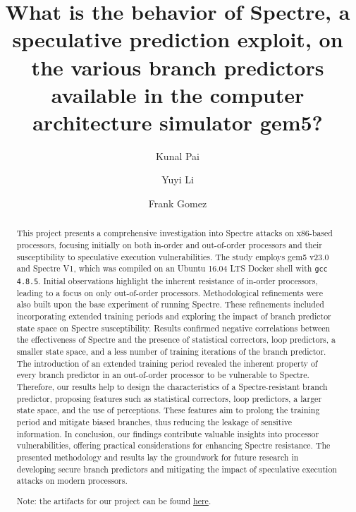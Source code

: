 \documentclass[twocolumn,showpacs,%
  nofootinbib,aps,superscriptaddress,%
  eqsecnum,prd,notitlepage,showkeys,10pt]{revtex4-1}
\begin{document}
\title{What is the behavior of Spectre, a speculative prediction exploit, on the various branch predictors available in the computer architecture simulator gem5?}
\author{Kunal Pai}
\author{Yuyi Li}
\author{Frank Gomez}

\begin{abstract}
This project presents a comprehensive investigation into Spectre attacks on x86-based processors, focusing initially on both in-order and out-of-order processors and their susceptibility to speculative execution vulnerabilities. The study employs gem5 v23.0 and Spectre V1, which was compiled on an Ubuntu 16.04 LTS Docker shell with \verb|gcc 4.8.5|. Initial observations highlight the inherent resistance of in-order processors, leading to a focus on only out-of-order processors. Methodological refinements were also built upon the base experiment of running Spectre. These refinements included incorporating extended training periods and exploring the impact of branch predictor state space on Spectre susceptibility. Results confirmed negative correlations between the effectiveness of Spectre and the presence of statistical correctors, loop predictors, a smaller state space, and a less number of training iterations of the branch predictor. The introduction of an extended training period revealed the inherent property of every branch predictor in an out-of-order processor to be vulnerable to Spectre. Therefore, our results help to design the characteristics of a Spectre-resistant branch predictor, proposing features such as statistical correctors, loop predictors, a larger state space, and the use of perceptions. These features aim to prolong the training period and mitigate biased branches, thus reducing the leakage of sensitive information. In conclusion, our findings contribute valuable insights into processor vulnerabilities, offering practical considerations for enhancing Spectre resistance. The presented methodology and results lay the groundwork for future research in developing secure branch predictors and mitigating the impact of speculative execution attacks on modern processors.

Note: the artifacts for our project can be found \href{https://github.com/kunpai/spectre-gem5-v23.0}{here}.
\end{abstract}

\maketitle
\end{document}
